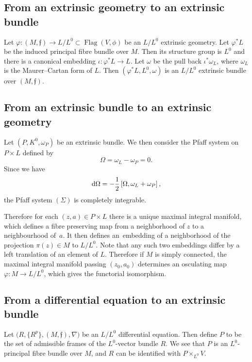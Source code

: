 \documentclass[10pt,a4paper]{amsart}
\newcommand{\f}{\mathfrak f}
\newcommand{\om}{\omega}
\newcommand{\Flag}{\operatorname{Flag}}
\numberwithin{equation}{section}
\begin{document}
\subsection{From an extrinsic geometry to an extrinsic bundle}\vspace{-.5mm}

Let $\varphi \colon (M,\f)\to L/L^0\subset \Flag(V,\phi)$ be an $L/L^0$ extrinsic geometry. Let $\varphi^*L$ be the induced principal fibre bundle over $M$. Then its structure group is $L^0$ and there is a canonical embedding $\iota\colon \varphi^*L\to L$. Let $\om$ be the pull back $\iota^*\om_L$, where $\om_L$ is the Maurer--Cartan form of $L$. Then $(\varphi^*L,L^0,\om)$ is an $L/L^0$ extrinsic bundle over $(M,\f)$.
\vspace{-.5mm}

\subsection{From an extrinsic bundle to an extrinsic geometry}

Let $\left(P,K^0,\om_P\right)$ be an extrinsic bundle. We then consider the Pfaff system on $P\times L$ defined by\vspace{-.5mm}
\[
\Omega = \om_L-\om_P = 0.\tag{$\Sigma$}
\]
Since we have\vspace{-.5mm}
\[
{\rm d}\Omega = -\frac12\left[\Omega, \om_L + \om_P\right],
\]
the Pfaff system $(\Sigma)$ is completely integrable.

Therefore for each $(z,a)\in P\times L$ there is a unique maximal integral manifold, which defines a fibre preserving map from a neighborhood of $z$ to a neighbourhood of~$a$. It then defines an~embedding of a neighborhood of the projection $\pi(z) \in M$ to $L/L^0$. Note that any such two embeddings differ by a left translation of an element of $L$.
Therefore
if $M$ is simply connected, the maximal integral manifold passing $(z_0, a_0) $ determines an osculating map
$\varphi\colon M \to L/L^0$, which gives the functorial isomorphism.


\subsection{From a differential equation to an extrinsic bundle}
	Let $\big(R, \{R^p\}, (M,\f), \nabla\big)$ be an $L/L^0$ differential equation. Then define $P$ to be the set of admissible frames of the $L^0$-vector bundle $R$. We see that $P$ is an $L^0$-principal fibre bundle over $M$, and $R$ can be identified with $P\times_{L^0} V$.
	
\end{document}
